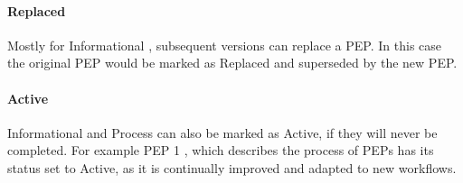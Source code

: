 \paragraph{Replaced}

Mostly for Informational , subsequent versions can replace a
\ac{PEP}. In this case the original \ac{PEP} would be marked as Replaced and
superseded by the new \ac{PEP}.

\paragraph{Active}

Informational and Process  can also be marked as Active, if they will never
be completed. For example \ac{PEP} 1 \cite{Warsaw2000}, which describes the
process of \acp{PEP} has its status set to Active, as it is continually
improved and adapted to new workflows.


